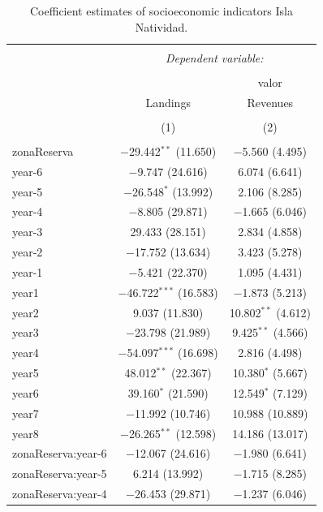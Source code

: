 \documentclass[utf8]{frontiers_suppmat} %
\begin{document}
\clearpage

\begin{table}[!htbp] \centering 
  \caption{Coefficient estimates of socioeconomic indicators Isla Natividad.} 
  \label{} 
\tiny 
\begin{tabular}{@{\extracolsep{1pt}}lcc} 
\\[-1.8ex]\hline 
\hline \\[-1.8ex] 
 & \multicolumn{2}{c}{\textit{Dependent variable:}} \\ 
\cline{2-3} 
\\[-1.8ex] &  & valor \\ 
 & Landings & Revenues \\ 
\\[-1.8ex] & (1) & (2)\\ 
\hline \\[-1.8ex] 
 zonaReserva & $-$29.442$^{**}$ (11.650) & $-$5.560 (4.495) \\ 
  year-6 & $-$9.747 (24.616) & 6.074 (6.641) \\ 
  year-5 & $-$26.548$^{*}$ (13.992) & 2.106 (8.285) \\ 
  year-4 & $-$8.805 (29.871) & $-$1.665 (6.046) \\ 
  year-3 & 29.433 (28.151) & 2.834 (4.858) \\ 
  year-2 & $-$17.752 (13.634) & 3.423 (5.278) \\ 
  year-1 & $-$5.421 (22.370) & 1.095 (4.431) \\ 
  year1 & $-$46.722$^{***}$ (16.583) & $-$1.873 (5.213) \\ 
  year2 & 9.037 (11.830) & 10.802$^{**}$ (4.612) \\ 
  year3 & $-$23.798 (21.989) & 9.425$^{**}$ (4.566) \\ 
  year4 & $-$54.097$^{***}$ (16.698) & 2.816 (4.498) \\ 
  year5 & 48.012$^{**}$ (22.367) & 10.380$^{*}$ (5.667) \\ 
  year6 & 39.160$^{*}$ (21.590) & 12.549$^{*}$ (7.129) \\ 
  year7 & $-$11.992 (10.746) & 10.988 (10.889) \\ 
  year8 & $-$26.265$^{**}$ (12.598) & 14.186 (13.017) \\ 
  zonaReserva:year-6 & $-$12.067 (24.616) & $-$1.980 (6.641) \\ 
  zonaReserva:year-5 & 6.214 (13.992) & $-$1.715 (8.285) \\ 
  zonaReserva:year-4 & $-$26.453 (29.871) & $-$1.237 (6.046) \\ 

\end{tabular}
\end{table}
\end{document}
